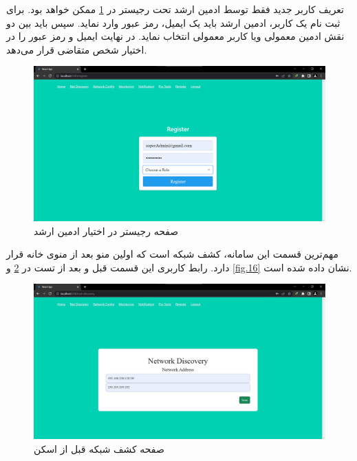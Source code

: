 \newpage

تعریف کاربر جدید فقط توسط ادمین ارشد تحت رجیستر در \cref{fig.14} ممکن خواهد بود. برای ثبت نام یک کاربر، ادمین ارشد باید یک ایمیل، رمز عبور وارد نماید. سپس باید بین دو نقش ادمین معمولی ویا کاربر معمولی انتخاب نماید. در نهایت ایمیل و رمز عبور را در اختیار شخص متقاضی قرار می‌دهد.


\begin{figure}[!h]
    \centering\includegraphics[scale=.38]{./register}
    \caption{صفحه رجیستر در اختیار ادمین ارشد}\label{fig.14}
\end{figure}


مهم‌ترین قسمت این سامانه، کشف شبکه است که اولین منو بعد از منوی خانه قرار دارد. رابط کاربری این قسمت قبل و بعد از تست در \cref{fig.15} و \cref{fig.16} نشان داده شده‌ است. 


\begin{figure}[!h]
    \centering\includegraphics[scale=.38]{./net-dis-before}
    \caption{صفحه کشف شبکه قبل از اسکن}\label{fig.15}
\end{figure}


